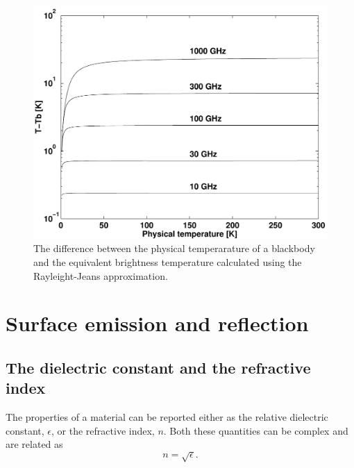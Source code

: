  \begin{figure}
  \begin{center}
   \begin{minipage}[c]{0.35\textwidth}
    \centering
    \caption{The difference between the physical temperarature of a 
             blackbody and the equivalent brightness temperature
             calculated using the Rayleight-Jeans approximation.}
    \label{fig:rtetheory:rayjean}
   \end{minipage}%
   \hspace{0.05\textwidth}%
   \begin{minipage}[c]{0.55\textwidth}
    \centering
    \includegraphics*[width=0.99\hsize]{fig_rayjean}
   \end{minipage}
  \end{center}
 \end{figure}   





\section{Surface emission and reflection}
\label{sec:surface}

\subsection{The dielectric constant and the refractive index}
The properties of a material can be reported either as the relative
dielectric constant, $\epsilon$, or the refractive index, $n$. Both
these quantities can be complex and are related as
\begin{equation}
  \label{eq:surface_eps2n}
  n = \sqrt{\epsilon}.
\end{equation}



